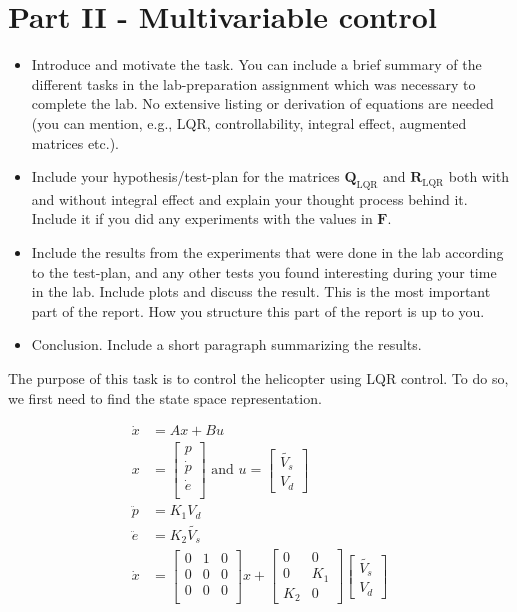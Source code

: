 \section{Part II - Multivariable control}
\begin{itemize}
    \item Introduce and motivate the task. You can include a brief summary of the different tasks in the lab-preparation assignment which was necessary to complete the lab. No extensive listing or derivation of equations are needed (you can mention, e.g., LQR, controllability, integral effect, augmented matrices etc.). 
    \item Include your hypothesis/test-plan for the matrices $\mathbf{Q}_{\text{LQR}}$ and $\mathbf{R}_{\text{LQR}}$ both with and without integral effect and explain your thought process behind it. Include it if you did any experiments with the values in $\mathbf{F}$.
    \item Include the results from the experiments that were done in the lab according to the test-plan, and any other tests you found interesting during your time in the lab. Include plots and discuss the result. This is the most important part of the report. How you structure this part of the report is up to you. 
    \item Conclusion. Include a short paragraph summarizing the results.
\end{itemize}

The purpose of this task is to control the helicopter using LQR control. To do so, we first need to find the state space representation.

\begin{align*}
    \dot{x}&=Ax+Bu \\
    x&=
    \begin{bmatrix}
        p \\
        \dot{p} \\
        \dot{e} \\
    \end{bmatrix}
    \text{ and } u=
    \begin{bmatrix}
        \tilde{V_s} \\
        V_d
    \end{bmatrix}\\
    \ddot{p}&=K_1 V_d \\
    \ddot{e}&=K_2 \tilde{V_s}\\
    \dot{x}&=
    \begin{bmatrix}
        0&1&0 \\
        0&0&0 \\
        0&0&0 \\
    \end{bmatrix}
    x+
    \begin{bmatrix}
        0&0 \\
        0&K_1 \\
        K_2&0
    \end{bmatrix}
    \begin{bmatrix}
        \tilde{V_s} \\
        V_d
    \end{bmatrix}\\
\end{align*}


